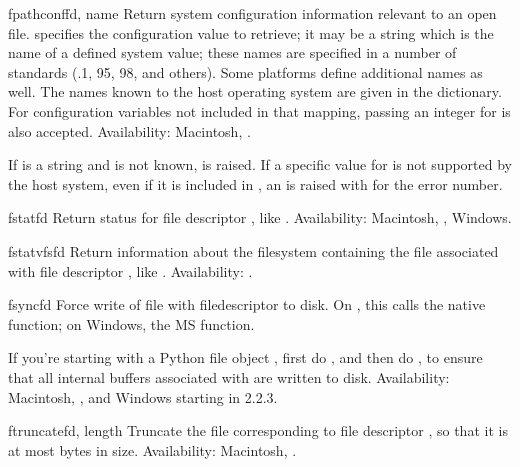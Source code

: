 \begin{funcdesc}{fpathconf}{fd, name}
Return system configuration information relevant to an open file.
 specifies the configuration value to retrieve; it may be a
string which is the name of a defined system value; these names are
specified in a number of standards (\POSIX.1, \UNIX{} 95, \UNIX{} 98, and
others).  Some platforms define additional names as well.  The names
known to the host operating system are given in the
 dictionary.  For configuration variables not
included in that mapping, passing an integer for  is also
accepted.
Availability: Macintosh, \UNIX.

If  is a string and is not known,  is
raised.  If a specific value for  is not supported by the
host system, even if it is included in , an
 is raised with  for the
error number.
\end{funcdesc}

\begin{funcdesc}{fstat}{fd}
Return status for file descriptor , like .
Availability: Macintosh, \UNIX, Windows.
\end{funcdesc}

\begin{funcdesc}{fstatvfs}{fd}
Return information about the filesystem containing the file associated
with file descriptor , like .
Availability: \UNIX.
\end{funcdesc}

\begin{funcdesc}{fsync}{fd}
Force write of file with filedescriptor  to disk.  On \UNIX,
this calls the native  function; on Windows, the
MS  function.

If you're starting with a Python file object , first do
, and then do ,
to ensure that all internal buffers associated with  are written
to disk.
Availability: Macintosh, \UNIX, and Windows starting in 2.2.3.
\end{funcdesc}

\begin{funcdesc}{ftruncate}{fd, length}
Truncate the file corresponding to file descriptor ,
so that it is at most  bytes in size.
Availability: Macintosh, \UNIX.
\end{funcdesc}

